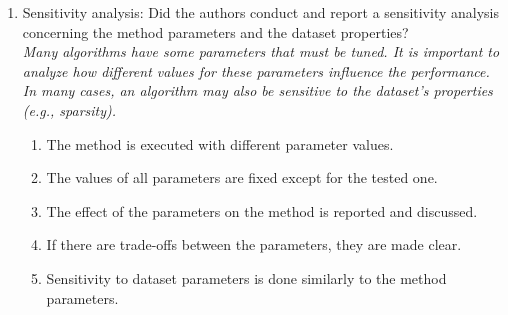 \documentclass{article}
\begin{document}
\begin{enumerate}
    \item Sensitivity analysis: 
    Did the authors conduct and report a sensitivity analysis concerning the method parameters and the dataset properties? 
    \\ \emph{Many algorithms have some parameters that must be tuned. It is important to analyze how different values for these parameters influence the performance. In many cases, an algorithm may also be sensitive to the dataset's properties (e.g., sparsity).}
    \begin{enumerate} [label*=\arabic*.]
        \item The method is executed with different parameter values.
        \item The values of all parameters are fixed except for the tested one.
        \item The effect of the parameters on the method is reported and discussed.
        \item If there are trade-offs between the parameters, they are made clear.
        \item Sensitivity to dataset parameters is done similarly to the method parameters.
    \end{enumerate}
\end{enumerate}
\end{document}
